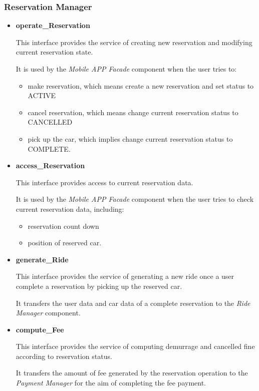 \documentclass[a4paper,11pt]{article}
\begin{document}
		\subsubsection{Reservation Manager}
			\begin{itemize}
				\item \textbf{operate\_Reservation}

This interface provides the service of creating new reservation and modifying current reservation state.

It is used by the \textsl{Mobile APP Facade} component when the user tries to:
					\begin{itemize}
						\item make reservation, which means create a new reservation and set status to ACTIVE
						\item cancel reservation, which means change current reservation status to CANCELLED
						\item pick up the car, which implies change current reservation status to COMPLETE.
					\end{itemize}
					
				\item \textbf{access\_Reservation}

This interface provides access to current reservation data.

It is used by the \textsl{Mobile APP Facade} component when the user tries to check current reservation data, including:
					\begin{itemize}
						\item reservation count down
						\item position of reserved car.
					\end{itemize}
					
				\item \textbf{generate\_Ride}

This interface provides the service of generating a new ride once a user complete a reservation by picking up the reserved car.

It transfers the user data and car data of a complete reservation to the \textsl{Ride Manager} component.
				
				\item \textbf{compute\_Fee}

This interface provides the service of computing demurrage and cancelled fine according to reservation status.

It transfers the amount of fee generated by the reservation operation to the \textsl{Payment Manager} for the aim of completing the fee payment.
			\end{itemize}
			
\end{document}
